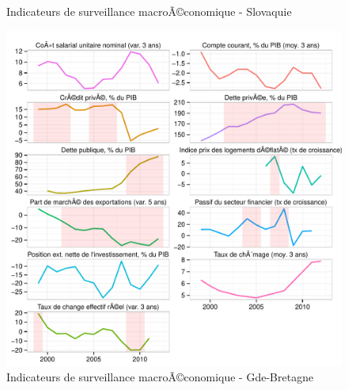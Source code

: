 \documentclass{article}\usepackage[]{graphicx}\usepackage[]{color}
\makeatletter
\def\maxwidth{ %
  \ifdim\Gin@nat@width>\linewidth
    \linewidth
  \else
    \Gin@nat@width
  \fi
}
\newenvironment{knitrout}{}{} %
\makeatother
\begin{document}
\begin{knitrout}
\begin{figure}[p]
{}

\caption[Indicateurs de surveillance macroÃ©conomique - Slovaquie]{Indicateurs de surveillance macroÃ©conomique - Slovaquie\label{fig:byco27}}
\end{figure}

\begin{figure}[p]


{\centering \includegraphics[width=\maxwidth]{figure_graph/byco28} 

}

\caption[Indicateurs de surveillance macroÃ©conomique - Gde-Bretagne]{Indicateurs de surveillance macroÃ©conomique - Gde-Bretagne\label{fig:byco28}}
\end{figure}


\end{knitrout}

\clearpage
\end{document}

